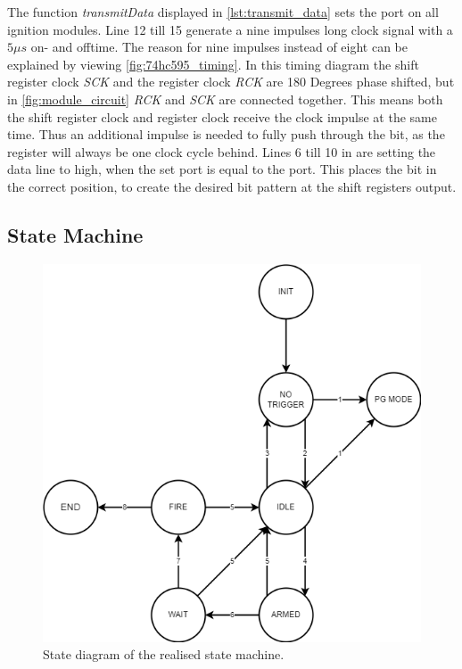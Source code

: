 

\noindent The function \textit{transmitData} displayed in \cref{lst:transmit_data} sets the port on all ignition modules. Line 12 till 15 generate a nine impulses long clock signal with a $5 \mu s$ on- and offtime. The reason for nine impulses instead of eight can be explained by viewing \cref{fig:74hc595_timing}. In this timing diagram the shift register clock \textit{SCK} and the register clock \textit{RCK} are 180 Degrees phase shifted, but in \cref{fig:module_circuit} \textit{RCK} and \textit{SCK} are connected together. This means both the shift register clock and register clock receive the clock impulse at the same time. Thus an additional impulse is needed to fully push through the bit, as the register will always be one clock cycle behind. Lines 6 till 10 in  are setting the data line to high, when the set port is equal to the port. This places the bit in the correct position, to create the desired bit pattern at the shift registers output.

\pagebreak

\subsection{State Machine}
\label{State Machine}

\begin{figure}[!ht]
    \centering
    \includegraphics[width=15cm]{./Figures/fsm.png}
    \caption{State diagram of the realised state machine.}
    \label{fig:state_machine}     
\end{figure}


